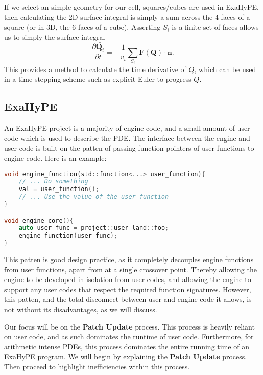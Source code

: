 If we select an simple geometry for our cell, squares/cubes are used in ExaHyPE, then calculating the 2D surface integral is simply a sum across the 4 faces of a square (or in 3D, the 6 faces of a cube).
Asserting $S_i$ is a finite set of faces allows us to simply the surface integral
\begin{equation}\label{eq:fv-simple}
   \frac{\partial \bar{\mathbf{Q}_i}}{\partial t} = -\frac{1}{v_i} \sum_{S_i}\mathbf{F}(\mathbf{Q})\cdot \mathbf{n}.
\end{equation}
This provides a method to calculate the time derivative of $Q$, which can be used in a time stepping scheme such as explicit Euler to progress $Q$.


\subsection{ExaHyPE}


\newcommand{\proc}[1]{\textbf{#1}}

An ExaHyPE project is a majority of engine code, and a small amount of user code which is used to describe the PDE.
The interface between the engine and user code is built on the patten of passing function pointers of user functions to engine code.
Here is an example:
\begin{lstlisting}[language=c]
void engine_function(std::function<...> user_function){
    // ... Do something
    val = user_function();
    // ... Use the value of the user function 
}

void engine_core(){
    auto user_func = project::user_land::foo;
    engine_function(user_func);
}
\end{lstlisting}

This patten is good design practice, as it completely decouples engine functions from user functions, apart from at a single crossover point.
Thereby allowing the engine to be developed in isolation from user codes, and allowing the engine to support any user codes that respect the required function signatures.
However, this patten, and the total disconnect between user and engine code it allows, is not without its disadvantages, as we will discuss.

Our focus will be on the \proc{Patch Update} process.
This process is heavily reliant on user code, and as such dominates the runtime of user code.
Furthermore, for arithmetic intense PDEs, this process dominates the entire running time of an ExaHyPE program.
We will begin by explaining the \proc{Patch Update} process.
Then proceed to highlight inefficiencies within this process. 


